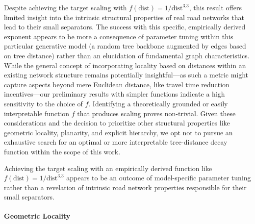 Despite achieving the target scaling with \(f(\text{dist}) = 1/\text{dist}^{3.3}\), this result offers limited insight into the intrinsic structural properties of real road networks that lead to their small separators.
The success with this specific, empirically derived exponent appears to be more a consequence of parameter tuning within this particular generative model (a random tree backbone augmented by edges based on tree distance) rather than an elucidation of fundamental graph characteristics.
While the general concept of incorporating locality based on distances within an existing network structure remains potentially insightful—as such a metric might capture aspects beyond mere Euclidean distance, like travel time reduction incentives—our preliminary results with simpler functions indicate a high sensitivity to the choice of \(f\).
Identifying a theoretically grounded or easily interpretable function \(f\) that produces  scaling proves non-trivial.
Given these considerations and the decision to prioritize other structural properties like geometric locality, planarity, and explicit hierarchy, we opt not to pursue an exhaustive search for an optimal or more interpretable tree-distance decay function within the scope of this work.

Achieving the target  scaling with an empirically derived function like \(f(\text{dist}) = 1/\text{dist}^{3.3}\) appears to be an outcome of model-specific parameter tuning rather than a revelation of intrinsic road network properties responsible for their small separators.

\paragraph{Geometric Locality}

